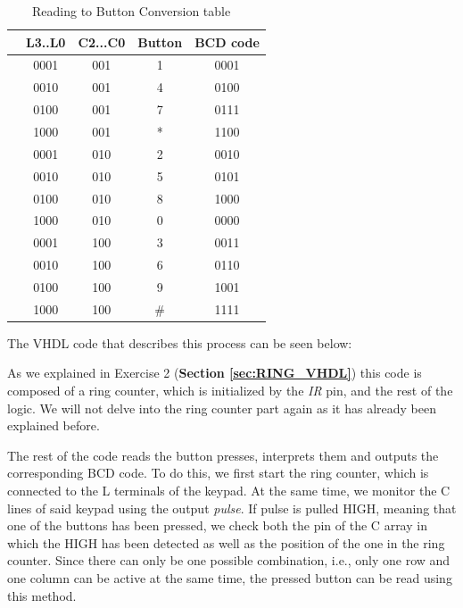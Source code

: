\begin{table}[H]
    \centering
        \begin{tabular}[t]{lcccc}
            \toprule
            &\textbf{L3..L0}&\textbf{C2...C0}&\textbf{Button}&\textbf{BCD code}\\
            \midrule
                &    0001   & 001     & 1      & 0001     \\
                &    0010   & 001     & 4      & 0100     \\
                &    0100   & 001     & 7      & 0111     \\
                &    1000   & 001     & *      & 1100     \\
                &    0001   & 010     & 2      & 0010     \\
                &    0010   & 010     & 5      & 0101     \\
                &    0100   & 010     & 8      & 1000     \\
                &    1000   & 010     & 0      & 0000     \\
                &    0001   & 100     & 3      & 0011     \\
                &    0010   & 100     & 6      & 0110     \\
                &    0100   & 100     & 9      & 1001     \\
                &    1000   & 100     & \#     & 1111     \\
            \bottomrule
        \end{tabular}
        \caption{Reading to Button Conversion table ~\autocite{SLIDES_5}}
        \label{table: KEYPAD_TABLE}
\end{table}


The VHDL code that describes this process can be seen below:


As we explained in Exercise 2 (\textbf{Section \ref{sec:RING_VHDL}}) this code is composed of a ring counter, which is initialized by the \textit{IR} pin, and the rest of the logic. We will not delve into the ring counter part again as it has already been explained before. \medskip

The rest of the code reads the button presses, interprets them and outputs the corresponding BCD code. To do this, we first start the ring counter, which is connected to the L terminals of the keypad. At the same time, we monitor the C lines of said keypad using the output \textit{pulse}. If pulse is pulled HIGH, meaning that one of the buttons has been pressed, we check both the pin of the C array in which the HIGH has been detected as well as the position of the one in the ring counter. Since there can only be one possible combination, i.e., only one row and one column can be active at the same time, the pressed button can be read using this method.\medskip

